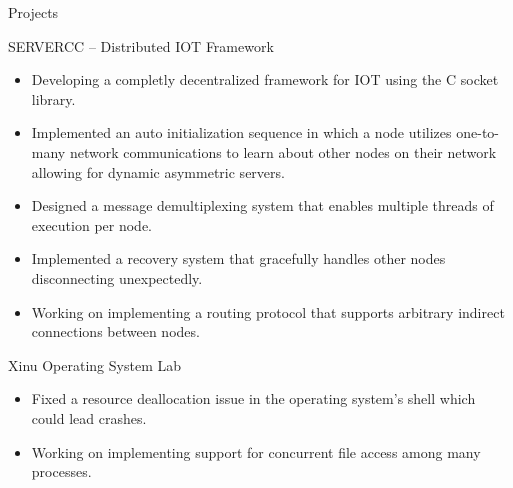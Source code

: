 \documentclass[]{article}
\newlength{\tabin}
\newlength{\secsep}
\newcommand{\lineunder}{\vspace*{-8pt} \\ \hspace*{-6pt} \hrulefill \\ \vspace*{-15pt}}
\newenvironment{tabbedsection}[1]{
  \begin{list}{}{
      \setlength{\itemsep}{0pt}
      \setlength{\labelsep}{0pt}
      \setlength{\labelwidth}{0pt}
      \setlength{\leftmargin}{\tabin}
      \setlength{\rightmargin}{\tabin}
      \setlength{\listparindent}{0pt}
      \setlength{\parsep}{0pt}
      \setlength{\parskip}{0pt}
      \setlength{\partopsep}{0pt}
      \setlength{\topsep}{#1}
    }
  \item[]
}{\end{list}}
\newenvironment{resume_section}[1]{
  \filbreak
  \vspace{2\secsep}
  \textsc{\large#1}
  \lineunder
  \begin{tabbedsection}{\secsep}
}{\end{tabbedsection}}
\newenvironment{resume_subsection}[2][]{
  \textbf{#2} \hfill {\footnotesize #1} \hspace{2em}
  \begin{tabbedsection}{0.5\secsep}
}{\end{tabbedsection}}
\newenvironment{subitems}{
  \renewcommand{\labelitemi}{-}
  \begin{itemize}
      \setlength{\labelsep}{1em}
}{\end{itemize}}
\begin{document}

\begin{resume_section}{Projects}

	\begin{resume_subsection}{SERVERCC -- Distributed IOT Framework}

		\begin{subitems}

			\item Developing a completly decentralized framework for IOT using the C socket library.

			\item Implemented an auto initialization sequence in which a node utilizes one-to-many
			network communications to learn about other nodes on their network allowing
			for dynamic asymmetric servers.

			\item Designed a message demultiplexing system that enables multiple threads of
			execution per node.

			\item Implemented a recovery system that gracefully handles other nodes disconnecting
			unexpectedly.

			\item Working on implementing a routing protocol that supports arbitrary indirect
			connections between nodes.

		\end{subitems}

	\end{resume_subsection}

	\begin{resume_subsection}[]{Xinu Operating System Lab}

		\begin{subitems}

			\item Fixed a resource deallocation issue in the operating system's shell which could
			lead crashes.

			\item Working on implementing support for concurrent file access among many processes.

		\end{subitems}

	\end{resume_subsection}

\end{resume_section}
\end{document}
